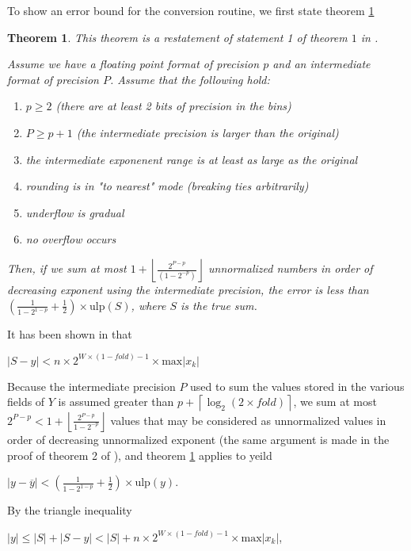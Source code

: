 \documentclass[12pt]{article}
\providecommand{\ceil}[1]{\left \lceil #1 \right \rceil }
\providecommand{\floor}[1]{\left \lfloor #1 \right \rfloor }
\providecommand{\max}{\ensuremath{\text{max}}}
\providecommand{\ulp}{\ensuremath{\text{ulp}}}
\theoremstyle{plain}
\newtheorem{thm}{Theorem}[section]
\begin{document}
    To show an error bound for the conversion routine, we first state theorem \ref{thm:sortsum}

    \begin{thm}
      This theorem is a restatement of statement 1 of theorem $1$ in \cite{sortsum}.

      Assume we have a floating point format of precision $p$ and an intermediate format of precision $P$. Assume that the following hold:
      \begin{enumerate}
        \item $p \geq 2$ (there are at least 2 bits of precision in the bins)
        \item $P \geq p + 1$ (the intermediate precision is larger than the original)
        \item the intermediate exponenent range is at least as large as the original
        \item rounding is in "to nearest" mode (breaking ties arbitrarily)
        \item underflow is gradual
        \item no overflow occurs
      \end{enumerate}
      Then, if we sum at most $1 + \floor{\frac{2^{P - p}}{(1 - 2^{-p})}}$ unnormalized numbers in order of decreasing exponent using the intermediate precision, the error is less than $(\frac{1}{1 - 2^{1 - p}} + \frac{1}{2})\times \ulp(S)$, where $S$ is the true sum.
      \label{thm:sortsum}
    \end{thm}

    It has been shown in \cite{repsum} that

    $|S - y| < n \times 2^{W \times (1 - fold) - 1} \times \max|x_k|$

    Because the intermediate precision $P$ used to sum the values stored in the various fields of $Y$ is assumed greater than $p + \ceil{\log_2(2 \times fold)}$, we sum at most $2^{P - p} < 1 + \floor{\frac{2^{P - p}}{1 - 2^{-p}}}$ values that may be considered as unnormalized values in order of decreasing unnormalized exponent (the same argument is made in the proof of theorem 2 of \cite{sortsum}), and theorem \ref{thm:sortsum} applies to yeild

    $|y - \overline{y}| < (\frac{1}{1 - 2^{1 - p}} + \frac{1}{2})\times \ulp(y)$.

    By the triangle inequality

    $|y| \leq |S| + |S - y| < |S| + n \times 2^{W \times (1 - fold) - 1} \times \max|x_k|$,
\end{document}
